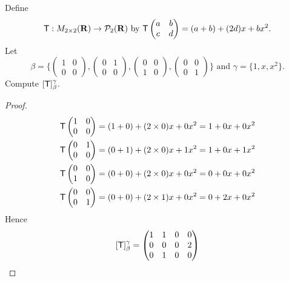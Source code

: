 \begin{exercise} \label{exercise 2.2.4}
Define
\[
\textsf{T}: M_{2 \times 2}(\mathbf{R}) \to \mathcal{P}_{2}(\mathbf{R}) \text { by }
    \textsf{T} \begin{pmatrix} a & b \\ c & d \end{pmatrix} = (a + b) + (2d)x + bx^{2}.
\]
Let
\[
    \beta = \bigg\{
                \begin{pmatrix} 1 & 0 \\ 0 & 0 \end{pmatrix},
                \begin{pmatrix} 0 & 1 \\ 0 & 0 \end{pmatrix},
                \begin{pmatrix} 0 & 0 \\ 1 & 0 \end{pmatrix},
                \begin{pmatrix} 0 & 0 \\ 0 & 1 \end{pmatrix}
            \bigg\}
    \text { and }
    \gamma = \{ 1, x, x^{2} \}.
\]
Compute \([\textsf{T}]_{\beta}^{\gamma}\).
\end{exercise}

\begin{proof}
\begin{align*}
    \textsf{T} \begin{pmatrix} 1 & 0 \\ 0 & 0 \end{pmatrix} = (1 + 0) + (2 \times 0)x + 0x^{2} = 1 + 0x + 0x^2 \\
    \textsf{T} \begin{pmatrix} 0 & 1 \\ 0 & 0 \end{pmatrix} = (0 + 1) + (2 \times 0)x + 1x^{2} = 1 + 0x + 1x^2 \\
    \textsf{T} \begin{pmatrix} 0 & 0 \\ 1 & 0 \end{pmatrix} = (0 + 0) + (2 \times 0)x + 0x^{2} = 0 + 0x + 0x^2 \\
    \textsf{T} \begin{pmatrix} 0 & 0 \\ 0 & 1 \end{pmatrix} = (0 + 0) + (2 \times 1)x + 0x^{2} = 0 + 2x + 0x^2
\end{align*}
Hence
\[
    [\textsf{T}]_{\beta}^{\gamma} = \begin{pmatrix}
        1 & 1 & 0 & 0 \\
        0 & 0 & 0 & 2 \\
        0 & 1 & 0 & 0
    \end{pmatrix}
\]
\end{proof}

